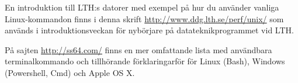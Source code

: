 \noindent En introduktion till LTH:s datorer med exempel på hur du använder vanliga Linux-kommandon finns i denna skrift \url{http://www.ddg.lth.se/perf/unix/} som används i introduktionsveckan för nybörjare på datateknikprogrammet vid LTH.

På sajten \url{http://ss64.com/} finns en mer omfattande lista med användbara terminalkommando och tillhörande förklaringarför för Linux (Bash), Windows (Powershell, Cmd) och Apple OS X.  